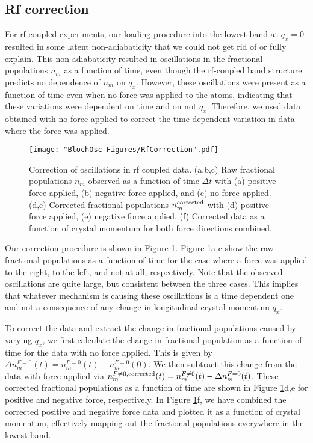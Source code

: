 \subsection{Rf correction} \label{sec:RfCorrection}
For rf-coupled experiments, our loading procedure into the lowest band at $q_x=0$ resulted in some latent non-adiabaticity that we could not get rid of or fully explain. This non-adiabaticity resulted in oscillations in the fractional populations $n_m$ as a function of time, even though the rf-coupled band structure predicts no dependence of $n_m$ on $q_x$. However, these oscillations were present as a function of time even when no force was applied to the atoms, indicating that these variations were dependent on time and on not $q_x$. Therefore, we used data obtained with no force applied to correct the time-dependent variation in data where the force was applied.
\begin{figure}
\texttt{[image: "BlochOsc Figures/RfCorrection".pdf]}
\caption[Correction of oscillations in rf coupled data]{Correction of oscillations in rf coupled data. (a,b,c) Raw fractional populations $n_m$ observed as a function of time $\Delta t$ with (a) positive force applied, (b) negative force applied, and (c) no force applied. (d,e) Corrected fractional populations $n_m^{\rm corrected}$ with (d) positive force applied, (e) negative force applied. (f) Corrected data as a function of crystal momentum for both force directions combined.  }
\label{fig:RfCorrection}
\end{figure}

Our correction procedure is shown in Figure \ref{fig:RfCorrection}.  Figure \ref{fig:RfCorrection}a-c show the raw fractional populations as a function of time for the case where a force was applied to the right, to the left, and not at all, respectively. Note that the observed oscillations are quite large, but consistent between the three cases. This implies that whatever mechanism is causing these oscillations is a time dependent one and not a consequence of any change in longitudinal crystal momentum $q_x$. 

To correct the data and extract the change in fractional populations caused by varying $q_x$, we first calculate the change in fractional population as a function of time for the data with no force applied. This is given by $\Delta n_m^{F=0}(t) = n_m^{F=0}(t) - n_m^{F=0}(0)$. We then subtract this change from the data with force applied via $n_m^{F\neq0,{\rm corrected}}(t)=n_m^{F\neq0}(t)-\Delta n_m^{F=0}(t)$. These corrected fractional populations as a function of time are shown in Figure \ref{fig:RfCorrection}d,e for positive and negative force, respectively. In Figure \ref{fig:RfCorrection}f, we have combined the corrected positive and negative force data and plotted it as a function of crystal momentum, effectively mapping out the fractional populations everywhere in the lowest band. 


